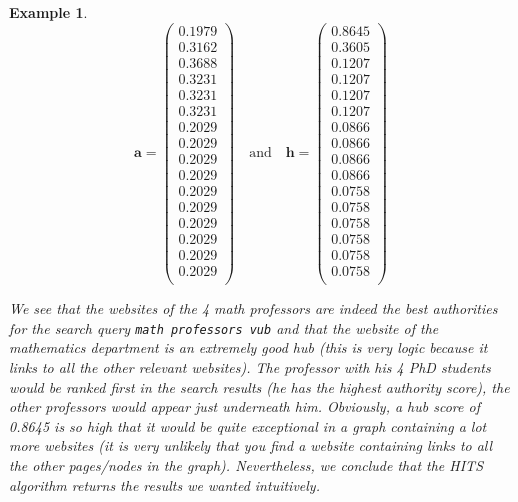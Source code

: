 \documentclass[a4paper,11pt]{report}
\newtheorem{example}[theorem]{Example}
\begin{document}
\begin{example}
$$ \mathbf{a} = \begin{pmatrix}
0.1979\\
0.3162\\
\mathbf{0.3688}\\
0.3231\\
0.3231\\
0.3231\\
0.2029\\
0.2029\\
0.2029\\
0.2029\\
0.2029\\
0.2029\\
0.2029\\
0.2029\\
0.2029\\
0.2029\\
\end{pmatrix} \quad \text{and} \quad
\mathbf{h} = \begin{pmatrix}
\mathbf{0.8645}\\
0.3605\\
0.1207\\
0.1207\\
0.1207\\
0.1207\\
0.0866\\
0.0866\\
0.0866\\
0.0866\\
0.0758\\
0.0758\\
0.0758\\
0.0758\\
0.0758\\
0.0758\\
\end{pmatrix}
$$

We see that the websites of the 4 math professors are indeed the best authorities for the search 
query \texttt{math professors vub} and that the website of the mathematics department is an 
extremely good hub (this is very logic because it links to all the other relevant 
websites). The professor with his 4 PhD students would be ranked first in the 
search results (he has the highest authority score), the other professors would 
appear just underneath him. Obviously, a hub score of 0.8645 is so high that it would be quite exceptional in 
a graph containing a lot more websites (it is very unlikely that you find a website containing links to all the other pages/nodes in the graph). Nevertheless, we conclude that the HITS algorithm returns the 
results we wanted intuitively.

\end{example}
\end{document}
